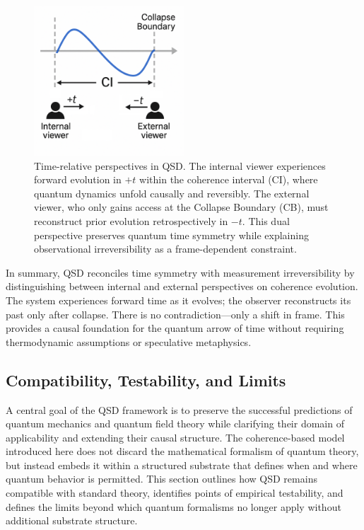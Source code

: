\documentclass[preprints,article,submit,pdftex,moreauthors]{Definitions/mdpi}
\begin{document}
\begin{figure}[ht]
    \centering
    \includegraphics[width=0.50\textwidth]{figures/timing.pdf}
    \caption{Time-relative perspectives in QSD. The internal viewer experiences forward evolution in \( +t \) within the coherence interval (CI), where quantum dynamics unfold causally and reversibly. The external viewer, who only gains access at the Collapse Boundary (CB), must reconstruct prior evolution retrospectively in \( -t \). This dual perspective preserves quantum time symmetry while explaining observational irreversibility as a frame-dependent constraint.}
    \label{fig:timing-perspective}
\end{figure}


In summary, QSD reconciles time symmetry with measurement irreversibility by distinguishing between internal and external perspectives on coherence evolution. The system experiences forward time as it evolves; the observer reconstructs its past only after collapse. There is no contradiction—only a shift in frame. This provides a causal foundation for the quantum arrow of time without requiring thermodynamic assumptions or speculative metaphysics.

\subsection{Compatibility, Testability, and Limits}
\label{subsec:compatibility}

A central goal of the QSD framework is to preserve the successful predictions of quantum mechanics and quantum field theory while clarifying their domain of applicability and extending their causal structure. The coherence-based model introduced here does not discard the mathematical formalism of quantum theory, but instead embeds it within a structured substrate that defines when and where quantum behavior is permitted. This section outlines how QSD remains compatible with standard theory, identifies points of empirical testability, and defines the limits beyond which quantum formalisms no longer apply without additional substrate structure.
\end{document}
